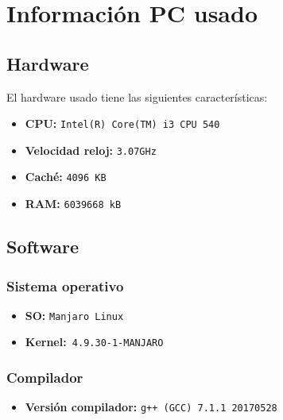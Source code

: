 



\maketitle %
\newpage %
\tableofcontents %
\listoffigures
\newpage


\section{Información PC usado}

\subsection{Hardware}
El hardware usado tiene las siguientes características:
\begin{itemize}
  \item \textbf{CPU:} \texttt{Intel(R) Core(TM) i3 CPU 540}
  \item \textbf{Velocidad reloj:} \texttt{3.07GHz}
  \item \textbf{Caché:} \texttt{4096 KB}
  \item \textbf{RAM:} \texttt{6039668 kB  }
\end{itemize}
\subsection{Software}
\subsubsection{Sistema operativo}
\begin{itemize}
  \item \textbf{SO:} \texttt{Manjaro Linux}
  \item \textbf{Kernel:}\texttt{ 4.9.30-1-MANJARO}
\end{itemize}
\subsubsection{Compilador}
\begin{itemize}
  \item \textbf{Versión compilador:} \texttt{g++ (GCC) 7.1.1 20170528}
\end{itemize}




